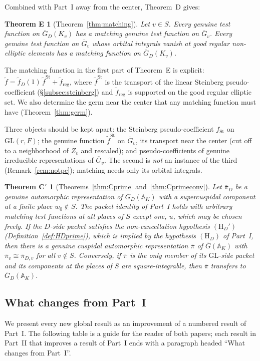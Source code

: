 \documentclass[12pt]{article}
\newcommand{\ov}[1]{\overline{#1}}
\newcommand{\A}{\mathbb{A}}
\newcommand{\reg}{\mathrm{reg}}
\newcommand{\GL}{\mathrm{GL}}
\newcommand{\St}{\mathrm{St}}
\newcommand{\Gb}{\ov{G}}
\newcommand{\Zb}{\ov{Z}}
\newcommand{\GDb}{\ov{G}_D}
\newcommand{\pib}{\ov{\pi}}
\theoremstyle{plain}
\newtheorem*{theoremE}{Theorem E}
\newtheorem*{theoremCp}{Theorem C$'$}
\theoremstyle{definition}
\begin{document}
Combined with Part~I away from the center, Theorem~D gives:

\begin{theoremE}[Theorem~\ref{thm:matching}]
Let $v\in S$. Every genuine test function on $\GDb(K_v)$ has a matching genuine test function on $\Gb_v$. Every genuine test function on $\Gb_v$ whose orbital integrals vanish at good regular non-elliptic elements has a matching function on $\GDb(K_v)$.
\end{theoremE}

The matching function in the first part of Theorem~E is explicit: $\tilde f=\tilde f_D(1)\,\tilde f^{\St}+\tilde f_{\reg}$, where $\tilde f^{\St}$ is the transport of the linear Steinberg pseudo-coefficient (\S\ref{subsec:steinberg}) and $\tilde f_{\reg}$ is supported on the good regular elliptic set. We also determine the germ near the center that any matching function must have (Theorem~\ref{thm:germ}).

Three objects should be kept apart: the Steinberg pseudo-coefficient $f_{\St}$ on $\GL(r,F)$; the genuine function $\tilde f^{\St}$ on $\Gb_v$, its transport near the center (cut off to a neighborhood of $\Zb_v$ and rescaled); and pseudo-coefficients of genuine irreducible representations of $\Gb_v$. The second is \emph{not} an instance of the third (Remark~\ref{rem:notpc}); matching needs only its orbital integrals.

\begin{theoremCp}[Theorems~\ref{thm:Cprime} and~\ref{thm:Cprimeconv}]
Let $\pib_D$ be a genuine automorphic representation of $\GDb(\A_K)$ with a supercuspidal component at a finite place $w_0\notin S$. The packet identity of Part~I holds with arbitrary matching test functions at all places of $S$ except one, $u$, which may be chosen freely. If the $D$-side packet satisfies the non-cancellation hypothesis $(\mathrm H_D')$ (Definition~\ref{def:HDprime}), which is implied by the hypothesis $(\mathrm H_D)$ of Part~I, then there is a genuine cuspidal automorphic representation $\pib$ of $\Gb(\A_K)$ with $\pib_v\cong\pib_{D,v}$ for all $v\notin S$. Conversely, if $\pib$ is the only member of its $\GL$-side packet and its components at the places of $S$ are square-integrable, then $\pib$ transfers to $\GDb(\A_K)$.
\end{theoremCp}

\subsection{What changes from Part~I}\label{subsec:changes}
We present every new global result as an improvement of a numbered result of Part~I. The following table is a guide for the reader of both papers; each result in Part~II that improves a result of Part~I ends with a paragraph headed ``What changes from Part~I''.
\end{document}
